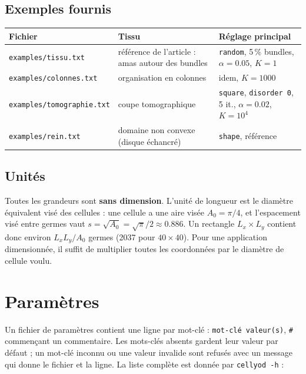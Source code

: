 \documentclass[10pt,a4paper]{article}
\newcommand{\code}[1]{\texttt{#1}}
\begin{document}
\subsection{Exemples fournis}

\begin{center}
\begin{tabularx}{\linewidth}{@{}lXl@{}}
  \toprule
  Fichier & Tissu & Réglage principal \\
  \midrule
  \code{examples/tissu.txt} & référence de l'article : amas autour des bundles &
    \code{random}, 5\,\% bundles, $\alpha=0.05$, $K=1$ \\
  \code{examples/colonnes.txt} & organisation en colonnes & idem, $K=1000$ \\
  \code{examples/tomographie.txt} & coupe tomographique & \code{square}, \code{disorder 0}, 5 it., $\alpha=0.02$,
    $K=10^4$ \\
  \code{examples/rein.txt} & domaine non convexe (disque échancré) & \code{shape}, référence \\
  \bottomrule
\end{tabularx}
\end{center}

\subsection{Unités}

Toutes les grandeurs sont \textbf{sans dimension}. L'unité de longueur est le diamètre équivalent visé des
cellules : une cellule a une aire visée $A_0=\pi/4$, et l'espacement visé entre germes vaut
$s=\sqrt{A_0}=\sqrt{\pi}/2\approx 0.886$. Un rectangle $L_x\times L_y$ contient donc environ
$L_xL_y/A_0$ germes (2037 pour $40\times40$). Pour une application dimensionnée, il suffit de multiplier toutes les
coordonnées par le diamètre de cellule voulu.

\section{Paramètres}\label{sec:params}

Un fichier de paramètres contient une ligne par mot-clé : \code{mot-clé valeur(s)}, \code{\#} commençant un
commentaire. Les mots-clés absents gardent leur valeur par défaut ; un mot-clé inconnu ou une valeur invalide
sont refusés avec un message qui donne le fichier et la ligne. La liste complète est donnée par
\code{cellyod -h} :

\end{document}
